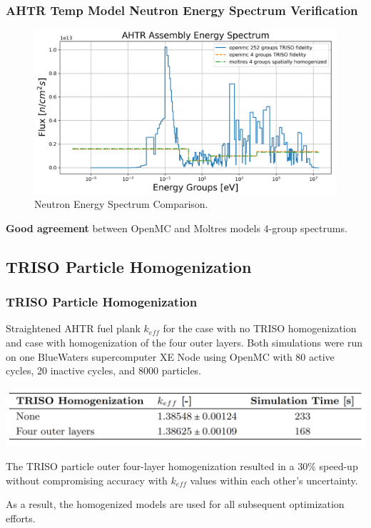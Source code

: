 \begin{frame}
    \frametitle{AHTR Temp Model Neutron Energy Spectrum Verification}
            \begin{figure}[]
                \centering
                \includegraphics[width=0.75\linewidth]{figures/benchmark-spectrum.png} 
                \caption{Neutron Energy Spectrum Comparison.}
            \end{figure}
        \textbf{Good agreement} between OpenMC and Moltres models 4-group spectrums.
\end{frame}

\subsection{TRISO Particle Homogenization}
\begin{frame}
    \frametitle{TRISO Particle Homogenization}
    \begin{table}
        \caption{Straightened \acrfull{AHTR} fuel plank $k_{eff}$ for the case with 
        no \gls{TRISO} homogenization and case with homogenization of the four outer 
        layers. Both simulations were run on one BlueWaters supercomputer XE Node 
        using OpenMC with 80 active 
        cycles, 20 inactive cycles, and 8000 particles.}
        \includegraphics[width=0.9\linewidth]{figures/triso-homogenization.png} 
    \end{table}

    The \gls{TRISO} particle outer four-layer homogenization resulted in a $30\%$ 
    speed-up without compromising accuracy with $k_{eff}$ values within each 
    other's uncertainty.

    \vspace{0.3cm}
    As a result, the homogenized models are used for all subsequent optimization efforts. 

\end{frame}

